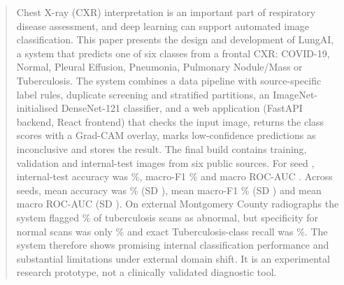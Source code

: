 \begin{abstract}
Chest X-ray (CXR) interpretation is an important part of respiratory disease assessment, and deep
learning can support automated image classification. This paper presents the design and development of
LungAI, a system that predicts one of six classes from a frontal CXR: COVID-19, Normal, Pleural
Effusion, Pneumonia, Pulmonary Nodule/Mass or Tuberculosis. The system combines a data pipeline with
source-specific label rules, duplicate screening and stratified partitions, an ImageNet-initialised
DenseNet-121 classifier, and a web application (FastAPI backend, React frontend) that checks the input
image, returns the class scores with a Grad-CAM overlay, marks low-confidence predictions as
inconclusive and stores the result. The final build contains \RNTrain{} training, \RNVal{} validation
and \RNTest{} internal-test images from six public sources. For seed \RSeed, internal-test accuracy was
\RTestAcc\%, macro-F1 \RTestMacroFOne\% and macro ROC-AUC \RTestMacroAUC. Across \RMSNRuns{} seeds, mean
accuracy was \RMSTestAccMean\% (SD \RMSTestAccSD), mean macro-F1 \RMSTestMacroFOneMean\% (SD
\RMSTestMacroFOneSD) and mean macro ROC-AUC \RMSTestMacroAUCMean{} (SD \RMSTestMacroAUCSD). On
\RNExternal{} external Montgomery County radiographs the system flagged \RExtSens\% of tuberculosis
scans as abnormal, but specificity for normal scans was only \RExtSpec\% and exact Tuberculosis-class
recall was \RExtTB\%. The system therefore shows promising internal classification performance and
substantial limitations under external domain shift. It is an experimental research prototype, not a
clinically validated diagnostic tool.
\end{abstract}
